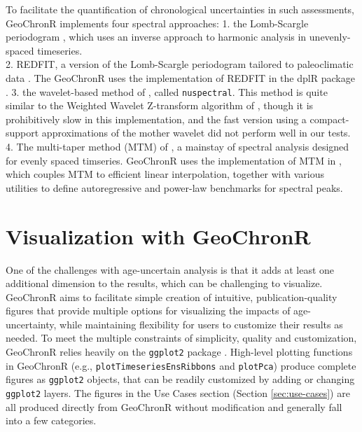 \documentclass[gc, manuscript]{copernicus}
\begin{document}
To facilitate the quantification of chronological uncertainties in such assessments, GeoChronR implements four spectral approaches:
1. the Lomb-Scargle periodogram \citep{VanderPlas_2018}, which uses an inverse approach to harmonic analysis in unevenly-spaced timeseries.\\
2. REDFIT, a version of the Lomb-Scargle periodogram tailored to paleoclimatic data \citep[\citet{Mudelsee_02}, \citet{Mudelsee_NPG09}]{SchulzMudelsee_02}.
The GeoChronR uses the implementation of REDFIT in the dplR package \citep{Bunn2008115}.
3. the wavelet-based method of \citet{Mathias_JSS04}, called \texttt{nuspectral}. This method is quite similar to the Weighted Wavelet Z-transform algorithm of \citet{Foster_AJ96}, though it is prohibitively slow in this implementation, and the fast version using a compact-support approximations of the mother wavelet did not perform well in our tests.
4. The multi-taper method (MTM) of \citet{thomson82}, a mainstay of spectral analysis \citep{Ghil02} designed for evenly spaced timseries. GeoChronR uses the implementation of MTM in \citet{astrochron}, which couples MTM to efficient linear interpolation, together with various utilities to define autoregressive and power-law benchmarks for spectral peaks.

\hypertarget{sec:visualization}{%
\section{Visualization with GeoChronR}\label{sec:visualization}}

One of the challenges with age-uncertain analysis is that it adds at least one additional dimension to the results, which can be challenging to visualize.
GeoChronR aims to facilitate simple creation of intuitive, publication-quality figures that provide multiple options for visualizing the impacts of age-uncertainty, while maintaining flexibility for users to customize their results as needed.
To meet the multiple constraints of simplicity, quality and customization, GeoChronR relies heavily on the \texttt{ggplot2} package \citep{ggplot2}.
High-level plotting functions in GeoChronR (e.g., \texttt{plotTimeseriesEnsRibbons} and \texttt{plotPca}) produce complete figures as \texttt{ggplot2} objects, that can be readily customized by adding or changing \texttt{ggplot2} layers.
The figures in the Use Cases section (Section \ref{sec:use-cases}) are all produced directly from GeoChronR without modification and generally fall into a few categories.
\end{document}
